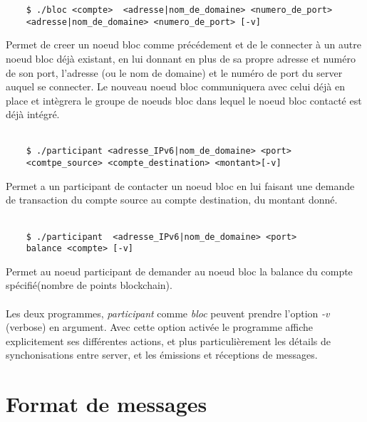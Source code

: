 \documentclass[a4paper,11pt,DIV=12]{scrreprt}
\begin{document}
    \begin{lstlisting}
    $ ./bloc <compte>  <adresse|nom_de_domaine> <numero_de_port>
    <adresse|nom_de_domaine> <numero_de_port> [-v]
    \end{lstlisting}

    Permet de creer un noeud bloc comme précédement et de le connecter à un autre
    noeud bloc déjà existant, en lui donnant en plus de sa propre adresse et
    numéro de son port, l'adresse (ou le nom de domaine) et
    le numéro de port du server auquel se connecter. Le nouveau noeud bloc
    communiquera avec celui déjà en place et intègrera le groupe de noeuds bloc
    dans lequel le noeud bloc contacté est déjà intégré.
    \\ \\

    \begin{lstlisting}
    $ ./participant <adresse_IPv6|nom_de_domaine> <port>
    <comtpe_source> <compte_destination> <montant>[-v]
    \end{lstlisting}

    Permet a un participant de contacter un noeud bloc en lui faisant une demande
    de transaction du compte source au compte destination, du montant donné.
    \\ \\

    \begin{lstlisting}
    $ ./participant  <adresse_IPv6|nom_de_domaine> <port>
    balance <compte> [-v]
    \end{lstlisting}

    Permet au noeud participant de demander au noeud bloc la balance du compte spécifié(nombre de points blockchain).
    \\ \\

    Les deux programmes, \emph{participant} comme \emph{bloc} peuvent prendre
    l'option \emph{-v} (verbose) en argument. Avec cette option activée le
    programme affiche explicitement ses différentes actions, et plus
    particulièrement les détails de synchonisations entre server, et les
    émissions et réceptions de messages.

    \chapter{Format de messages}
\end{document}
